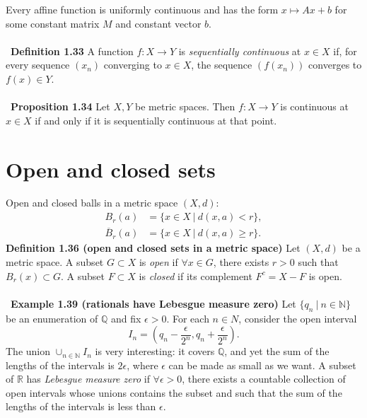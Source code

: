 \documentclass[12 pt]{article}
\newcommand{\R}{\mathbb{R}}
\newcommand{\Q}{\mathbb{Q}}
\newcommand{\N}{\mathbb{N}}
\newcommand{\LP}{\left(}
\newcommand{\RP}{\right)}
\numberwithin{equation}{section}
\begin{document}
{Every affine function is uniformly continuous and has the form $x \mapsto Ax + b$ for some constant matrix $M$ and constant vector $b$.\\
\\
\
\textbf{Definition 1.33} A function $f: X \to Y$ is \textit{sequentially continuous} at $x \in X$ if, for every sequence $(x_n)$ converging to $x \in X$, the sequence $(f(x_n))$ converges to $f(x) \in Y$.\\
\\
\
\textbf{Proposition 1.34} Let $X, Y$ be metric spaces. Then $f: X \to Y$ is continuous at $x \in X$ if and only if it is sequentially continuous at that point.











\section{Open and closed sets}


Open and closed balls in a metric space $(X,d)$: \begin{align*}
B_r(a) & = \{ x \in X \ | \ d(x,a) < r \}, \\
\overline{B}_r(a) & = \{ x \in X \ | \ d(x,a) \geq r \}.
\end{align*}
\textbf{Definition 1.36 (open and closed sets in a metric space)} Let $(X, d)$ be a metric space. A subset $G \subset X$ is \textit{open} if $\forall x \in G$, there exists $r > 0$ such that $B_r(x) \subset G$. A subset $F \subset X$ is \textit{closed} if its complement $F^c = X - F$ is open.\\
\\
\
\textbf{Example 1.39 (rationals have Lebesgue measure zero)} Let $\{q_n \ | \ n \in \N\}$ be an enumeration of $\Q$ and fix $\epsilon > 0$. For each $n \in N$, consider the open interval \begin{equation*}
I_n = \LP q_n - \frac{\epsilon}{2^n}, q_n + \frac{\epsilon}{2^n} \RP.
\end{equation*}
The union $\cup_{n \in \N} I_n$ is very interesting: it covers $\Q$, and yet the sum of the lengths of the intervals is $2\epsilon$, where $\epsilon$ can be made as small as we want. A subset of $\R$ has \textit{Lebesgue measure zero} if $\forall \epsilon > 0$, there exists a countable collection of open intervals whose unions contains the subset and such that the sum of the lengths of the intervals is less than $\epsilon$.
















}
\end{document}
